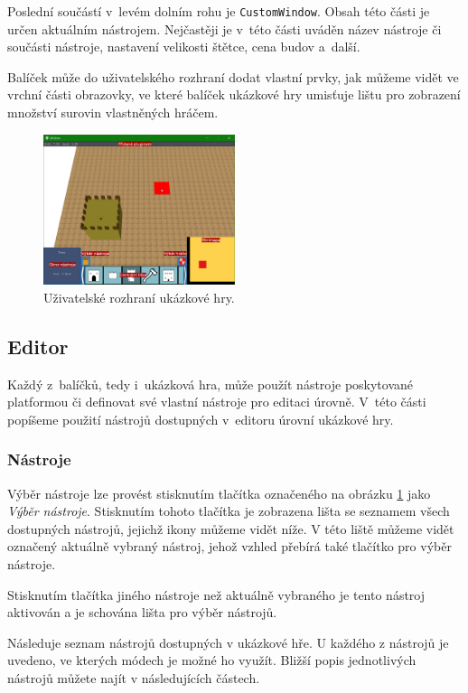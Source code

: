 Poslední součástí v~levém dolním rohu je \texttt{CustomWindow}. Obsah této části je určen aktuálním nástrojem. Nejčastěji je v~této části uváděn název nástroje či součásti nástroje, nastavení velikosti štětce, cena budov a~další.

Balíček může do uživatelského rozhraní dodat vlastní prvky, jak můžeme vidět ve vrchní části obrazovky, ve které balíček ukázkové hry umisťuje lištu pro zobrazení množství surovin vlastněných hráčem.

\begin{figure}[h]
	\centering
	\includegraphics[width=0.5\textwidth]{img/GameUI.png}
	\caption{Uživatelské rozhraní ukázkové hry.}
	\label{fig:UI}
\end{figure}

\subsection{Editor}
Každý z~balíčků, tedy i~ukázková hra, může použít nástroje poskytované platformou či definovat své vlastní nástroje pro editaci úrovně. V~této části popíšeme použití nástrojů dostupných v~editoru úrovní ukázkové hry.

\subsubsection{Nástroje}

Výběr nástroje lze provést stisknutím tlačítka označeného na obrázku \ref{fig:UI} jako \textit{Výběr nástroje}. Stisknutím tohoto tlačítka je zobrazena lišta se seznamem všech dostupných nástrojů, jejichž ikony můžeme vidět níže. V této liště můžeme vidět označený aktuálně vybraný nástroj, jehož vzhled přebírá také tlačítko pro výběr nástroje. 

Stisknutím tlačítka jiného nástroje než aktuálně vybraného je tento nástroj aktivován a je schována lišta pro výběr nástrojů.

Následuje seznam nástrojů dostupných v ukázkové hře. U každého z nástrojů je uvedeno, ve kterých módech je možné ho využít. Bližší popis jednotlivých nástrojů můžete najít v následujících částech.

